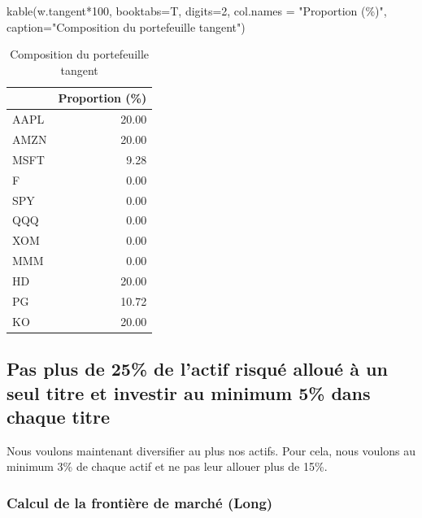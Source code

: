 \documentclass[
]{article}
\newenvironment{Shaded}{\begin{snugshade}}{\end{snugshade}}
\newcommand{\AttributeTok}[1]{\textcolor[rgb]{0.77,0.63,0.00}{#1}}
\newcommand{\DecValTok}[1]{\textcolor[rgb]{0.00,0.00,0.81}{#1}}
\newcommand{\FunctionTok}[1]{\textcolor[rgb]{0.00,0.00,0.00}{#1}}
\newcommand{\NormalTok}[1]{#1}
\newcommand{\SpecialCharTok}[1]{\textcolor[rgb]{0.00,0.00,0.00}{#1}}
\newcommand{\StringTok}[1]{\textcolor[rgb]{0.31,0.60,0.02}{#1}}
\begin{document}
\begin{Shaded}
\begin{Highlighting}[]
\FunctionTok{kable}\NormalTok{(w.tangent}\SpecialCharTok{*}\DecValTok{100}\NormalTok{, }\AttributeTok{booktabs=}\NormalTok{T, }\AttributeTok{digits=}\DecValTok{2}\NormalTok{, }\AttributeTok{col.names =} \StringTok{"Proportion (\%)"}\NormalTok{,}
      \AttributeTok{caption=}\StringTok{"Composition du portefeuille tangent"}\NormalTok{)}
\end{Highlighting}
\end{Shaded}

\begin{table}

\caption{\label{tab:unnamed-chunk-16}Composition du portefeuille tangent}
\centering
\begin{tabular}[t]{lr}
\toprule
  & Proportion (\%)\\
\midrule
AAPL & 20.00\\
AMZN & 20.00\\
MSFT & 9.28\\
F & 0.00\\
SPY & 0.00\\
\addlinespace
QQQ & 0.00\\
XOM & 0.00\\
MMM & 0.00\\
HD & 20.00\\
PG & 10.72\\
\addlinespace
KO & 20.00\\
\bottomrule
\end{tabular}
\end{table}

\hypertarget{pas-plus-de-25-de-lactif-risquuxe9-allouuxe9-uxe0-un-seul-titre-et-investir-au-minimum-5-dans-chaque-titre}{%
\subsection{Pas plus de 25\% de l'actif risqué alloué à un seul titre et
investir au minimum 5\% dans chaque
titre}\label{pas-plus-de-25-de-lactif-risquuxe9-allouuxe9-uxe0-un-seul-titre-et-investir-au-minimum-5-dans-chaque-titre}}

Nous voulons maintenant diversifier au plus nos actifs. Pour cela, nous
voulons au minimum 3\% de chaque actif et ne pas leur allouer plus de
15\%.

\hypertarget{calcul-de-la-frontiuxe8re-de-marchuxe9-long-2}{%
\subsubsection{Calcul de la frontière de marché
(Long)}\label{calcul-de-la-frontiuxe8re-de-marchuxe9-long-2}}
\end{document}
